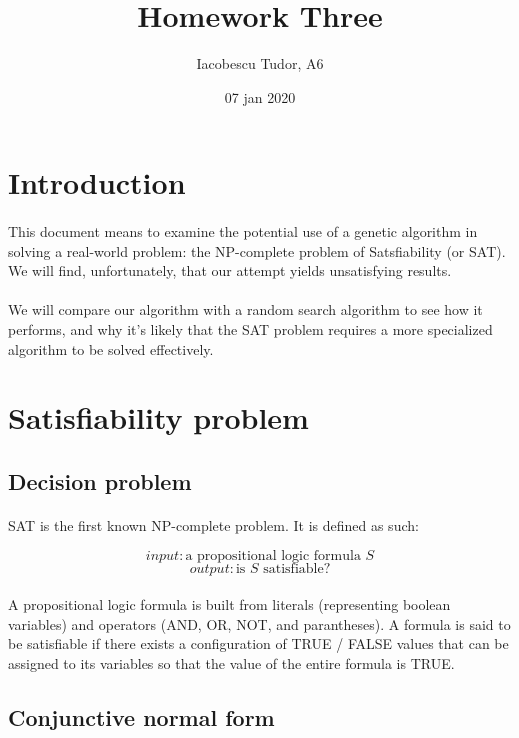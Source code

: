 \documentclass{article}
\title{Homework Three}
\date{07 jan 2020}
\author{Iacobescu Tudor, A6}
\begin{document}
\maketitle
{}

\section{Introduction}
\paragraph{}
This document means to examine the potential use of a genetic algorithm\cite{breaban} in solving a real-world problem: the NP-complete problem of Satsfiability (or SAT). We will find, unfortunately, that our attempt yields unsatisfying results. 
\paragraph{}
We will compare our algorithm with a random search algorithm to see how it performs, and why it's likely that the SAT problem requires a more specialized algorithm to be solved effectively.
\section{Satisfiability problem}
\subsection{Decision problem}
\paragraph{}
SAT is the first known NP-complete problem. It is defined as such:

$$input: \text{a propositional logic formula } S$$
$$output: \text{is } S \text{ satisfiable?}$$

\paragraph{}
A propositional logic formula is built from literals (representing boolean variables) and operators (AND, OR, NOT, and parantheses). A formula is said to be satisfiable if there exists a configuration of TRUE / FALSE values that can be assigned to its variables so that the value of the entire formula is TRUE. 

\subsection{Conjunctive normal form}
\end{document}
